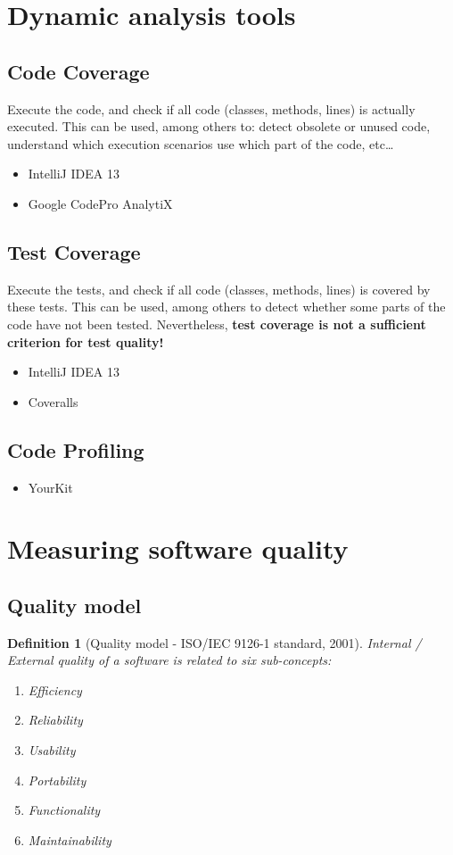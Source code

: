 \documentclass[a4paper,11pt]{report}
\newtheorem{definition}{Definition}
\begin{document}
\section{Dynamic analysis tools}
\subsection{Code Coverage}
Execute the code, and check if all code (classes, methods, lines) is actually
executed. This can be used, among others to: detect obsolete or unused code,
understand which execution scenarios use which part of the code, etc\dots

\begin{itemize}
\item IntelliJ IDEA 13
\item Google CodePro AnalytiX
\end{itemize}

\subsection{Test Coverage}
Execute the tests, and check if all code (classes, methods, lines) is covered by
these tests. This can be used, among others to detect whether some parts of the
code have not been tested. Nevertheless, \textbf{test coverage is not a
sufficient criterion for test quality!}

\begin{itemize}
\item IntelliJ IDEA 13
\item Coveralls
\end{itemize}

\subsection{Code Profiling}
\begin{itemize}
\item YourKit
\end{itemize}

\section{Measuring software quality}
\subsection{Quality model}
\begin{definition}[Quality model - ISO/IEC 9126-1 standard, 2001]
Internal / External quality of a software is related to six sub-concepts:
\begin{enumerate}
\item Efficiency
\item Reliability
\item Usability
\item Portability
\item Functionality
\item Maintainability
\end{enumerate}
\end{definition}
\end{document}
